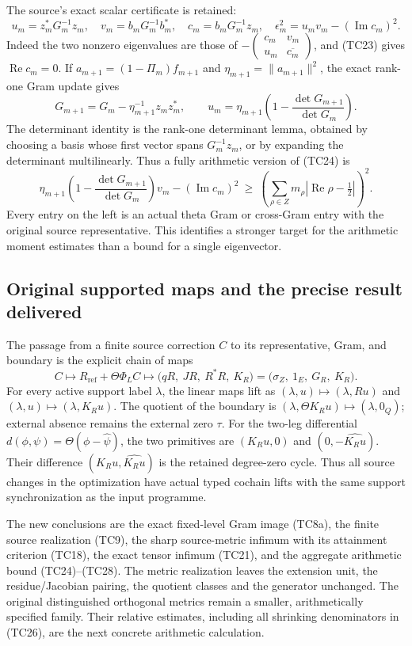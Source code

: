 The source's exact scalar certificate is retained:
\[
 u_m=z_m^*G_m^{-1}z_m,\quad
 v_m=b_mG_m^{-1}b_m^*,\quad c_m=b_mG_m^{-1}z_m,\quad
 \epsilon_m^2=u_mv_m-(\operatorname{Im}c_m)^2.
 \tag{TC26}
\]
Indeed the two nonzero eigenvalues are those of
\(-\left(\begin{smallmatrix}c_m&v_m\\u_m&\overline{c_m}\end{smallmatrix}\right)\),
and (TC23) gives \(\operatorname{Re}c_m=0\).
If \(a_{m+1}=(1-\Pi_m)f_{m+1}\) and
\(\eta_{m+1}=\|a_{m+1}\|^2\), the exact rank-one Gram update gives
\[
 G_{m+1}=G_m-\eta_{m+1}^{-1}z_mz_m^*,\qquad
 u_m=\eta_{m+1}
       \left(1-\frac{\det G_{m+1}}{\det G_m}\right).
 \tag{TC27}
\]
The determinant identity is the rank-one determinant lemma, obtained
by choosing a basis whose first vector spans \(G_m^{-1}z_m\), or
by expanding the determinant multilinearly.  Thus a fully arithmetic
version of (TC24) is
\[
 \eta_{m+1}\left(1-\frac{\det G_{m+1}}{\det G_m}\right)v_m
       -(\operatorname{Im}c_m)^2
 \ \geq\
 \left(\sum_{\rho\in Z}m_\rho
           |\operatorname{Re}\rho-\tfrac12|\right)^2 .
 \tag{TC28}
\]
Every entry on the left is an actual theta Gram or cross-Gram entry
with the original source representative.  This identifies a stronger
target for the arithmetic moment estimates than a bound for a single
eigenvector.

\subsection{Original supported maps and the precise result delivered}

The passage from a finite source correction \(C\) to its representative,
Gram, and boundary is the explicit chain of maps
\[
 C\longmapsto R_{\mathrm{ref}}+\Theta\Phi_LC
   \longmapsto\bigl(qR,\ JR,\ R^*R,\ K_R\bigr)
   =\bigl(\sigma_Z,\ 1_E,\ G_R,\ K_R\bigr).
 \tag{TC29}
\]
For every active support label \(\lambda\), the linear maps lift as
\((\lambda,u)\mapsto(\lambda,Ru)\) and
\((\lambda,u)\mapsto(\lambda,K_Ru)\).
The quotient of the boundary is
\((\lambda,\Theta K_Ru)\mapsto(\lambda,0_Q)\);
external absence remains the external zero \(\tau\).
For the two-leg differential
\(d(\phi,\psi)=\Theta(\phi-\widehat\psi)\), the two primitives are
\((K_Ru,0)\) and \((0,-\widehat{K_Ru})\).
Their difference \((K_Ru,\widehat{K_Ru})\) is the retained degree-zero
cycle.  Thus all source changes in the optimization have actual
typed cochain lifts with the same support synchronization as the
input programme.

The new conclusions are the exact fixed-level Gram image (TC8a), the
finite source realization (TC9), the sharp
source-metric infimum with its attainment criterion (TC18), the exact
tensor infimum (TC21), and the aggregate arithmetic bound
(TC24)--(TC28).  The metric realization leaves the extension unit,
the residue/Jacobian pairing, the quotient classes and the generator
unchanged.  The original distinguished orthogonal metrics remain a
smaller, arithmetically specified family.  Their relative estimates,
including all shrinking denominators in (TC26), are the next concrete
arithmetic calculation.
